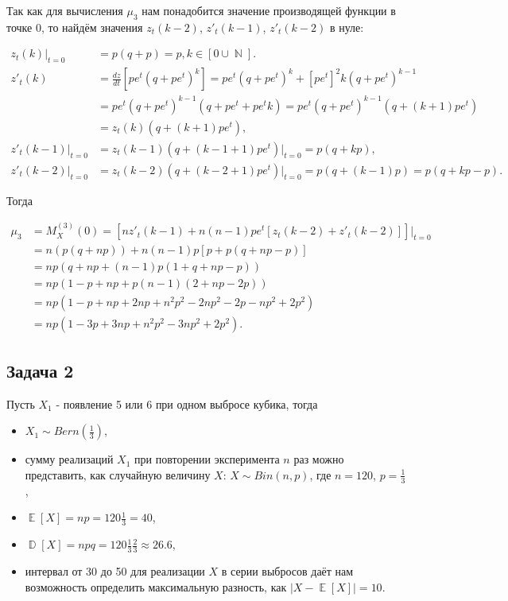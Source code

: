 \documentclass[a4paper,11pt]{article}
\DeclareMathOperator*{\D}{\mathbb{D}}   %
\DeclareMathOperator*{\E}{\mathbb{E}}   %
\DeclareMathOperator*{\N}{\mathbb{N}}   %
\begin{document}
Так как для вычисления $\mu_3$ нам понадобится значение производящей функции в точке 0, то найдём значения $z_t(k-2)$, $z'_t(k-1)$, $z'_t(k-2)$ в нуле:

\begin{align*}
z_t(k)|_{t=0} & = p(q+p) = p, k \in [0\cup\N]. \\
z'_t(k) & = \frac{dz}{dt}[pe^t(q+pe^t)^k] = pe^t(q+pe^t)^k +[pe^t]^2k(q+pe^t)^{k-1} \\
& = pe^t(q+pe^t)^{k-1}(q+pe^t + pe^tk) = pe^t(q+pe^t)^{k-1}(q+(k+1)pe^t) \\
& = z_t(k)(q+(k+1)pe^t), \\
z'_t(k-1)|_{t=0} & = z_t(k-1)(q+(k-1+1)pe^t)|_{t=0} = p(q+kp), \\
z'_t(k-2)|_{t=0} & = z_t(k-2)(q+(k-2+1)pe^t)|_{t=0} = p(q+(k-1)p) = p(q + kp - p).
\end{align*}

Тогда

\begin{align*} 
\mu_3 & = M^{(3)}_X(0) = [nz'_t(k-1) + n(n-1)pe^t[z_t(k-2) + z'_t(k-2)]]|_{t=0} \\
& = n(p(q+np)) + n(n-1)p[p + p(q + np-p)] \\
& = np(q+np+(n-1)p(1+q+np-p)) \\
& = np(1-p+np+p(n-1)(2+np-2p)) \\
& = np(1-p+np+2np+n^2p^2-2np^2-2p-np^2+2p^2) \\
& = \boxed{np(1-3p+3np+n^2p^2-3np^2+2p^2)}.
\end{align*}

\subsection{Задача 2}

Пусть $X_1$ - появление 5 или 6 при одном выбросе кубика, тогда

\begin{itemize}
\item $X_1 \sim Bern(\frac{1}{3})$,
\item сумму реализаций $X_1$ при повторении эксперимента $n$ раз можно представить, как случайную величину $X$: $X \sim Bin(n, p)$, где $n = 120$, $p = \frac{1}{3}$,
\item $\E[X] = np = 120\frac{1}{3} = 40$,
\item $\D[X] = npq = 120\frac{1}{3}\frac{2}{3} \approx 26.6$,
\item интервал от 30 до 50 для реализации $X$ в серии выбросов даёт нам возможность определить максимальную разность, как $|X - \E[X]| = 10$.
\end{itemize}
\end{document}
